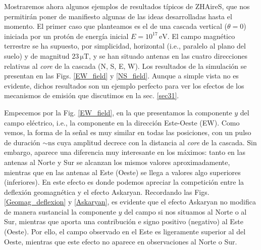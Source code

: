 \documentclass[12 pt, a4paper]{article} %
\numberwithin{equation}{section}
\numberwithin{figure}{section}
\begin{document}
Mostraremos ahora algunos ejemplos de resultados típicos de ZHAireS, que nos permitirán poner de manifiesto algunas de las ideas desarrolladas hasta el momento. El primer caso que planteamos es el de una cascada vertical ($\theta=0$) iniciada por un protón de energía inicial $E=10^{17}\,\mathrm{eV}$. El campo magnético terrestre se ha supuesto, por simplicidad, horizontal (i.e., paralelo al plano del suelo) y de magnitud $23\,\mathrm{\mu T}$, y se han situado antenas en las cuatro direcciones relativas al \textit{core} de la cascada (N, S, E, W). Los resultados de la simulación se presentan en las Figs. \ref{EW_field} y \ref{NS_field}. Aunque a simple vista no es evidente, dichos resultados son un ejemplo perfecto para ver los efectos de los mecanismos de emisión que discutimos en la sec. \ref{sec31}. 

Empecemos por la Fig. \ref{EW_field}, en la que presentamos la componente $y$ del campo eléctrico, i.e., la componente en la dirección Este-Oeste (EW). Como vemos, la forma de la señal es muy similar en todas las posiciones, con un pulso de duración $\sim \mathrm{ns}$ cuya amplitud decrece con la distancia al \textit{core} de la cascada. Sin embargo, aparece una diferencia muy interesante en los máximos: tanto en las antenas al Norte y Sur se alcanzan los mismos valores aproximadamente, mientras que en las antenas al Este (Oeste) se llega a valores algo superiores (inferiores). En este efecto es donde podemos apreciar la competición entre la deflexión geomagnética y el efecto Askaryan. Recordando las Figs. \ref{Geomag_deflexion} y \ref{Askaryan}, es evidente que el efecto Askaryan no modifica de manera sustancial la componente $y$ del campo si nos situamos al Norte o al Sur, mientras que aporta una contribución e signo positivo (negativo) al Este (Oeste). Por ello, el campo observado en el Este es ligeramente superior al del Oeste, mientras que este efecto no aparece en observaciones al Norte o Sur.
\end{document}
